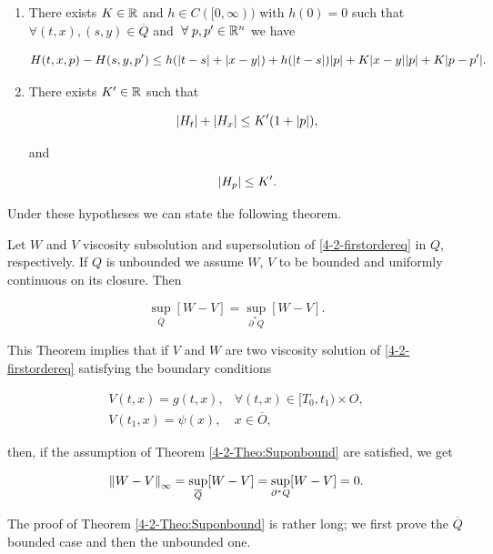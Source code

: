 \begin{enumerate}\label{4-2-Hassumptions}
    \item There exists $K\in\mathbb{R}$ and $h\in C([0,\infty))$ with $h(0)=0$ such that $\forall (t,x),(s,y)\in\overline{Q}$ and $\forall p,p'\in\R^n$ we have
    
    \[H(t,x,p)-H(s,y,p')\leq h(\abs{t-s}+\abs{x-y})+h(\abs{t-s})\abs{p}+K\abs{x-y}\abs{p} + K\abs{p-p'}.\]
    
    \item There exists $K'\in\mathbb{R}$ such that
    
    \[\abs{H_t}+\abs{H_x}\leq K'(1+\abs{p}),\]

    and

    \[\abs{H_p}\leq K'.\]
\end{enumerate}

Under these hypotheses we can state the following theorem.

\begin{theorem}\label{4-2-Theo:Suponbound}
    Let $W$ and $V$ viscosity subsolution and supersolution of \ref{4-2-firstordereq} in $Q$, respectively. If $Q$ is unbounded we assume $W$, $V$ to be bounded and 
    uniformly continuous on its closure. Then
    
    \[\sup_{\overline{Q}}[W-V] = \sup_{\partial^{\ast}Q}[W-V].\]
\end{theorem}

This Theorem implies that if $V$ and $W$ are two viscosity solution of \ref{4-2-firstordereq} satisfying the boundary conditions

\begin{equation}\label{4-2-TerminalcondV}
    \begin{aligned}
        V(t,x) = g(t,x),&\forall(t,x)\in[T_0,t_1)\times O, \\
        V(t_1,x) = \psi(x),&x\in\overline{O},
    \end{aligned}
\end{equation}

then, if the assumption of Theorem \ref{4-2-Theo:Suponbound} are satisfied, we get

\[\norm{W-V}_{\infty} = \sup_{\overline{Q}}[W-V]=\sup_{\partial^{\ast}Q}[W-V] = 0.\]

The proof of Theorem \ref{4-2-Theo:Suponbound} is rather long; we first prove the $\overline{Q}$ bounded case and then the unbounded one.

